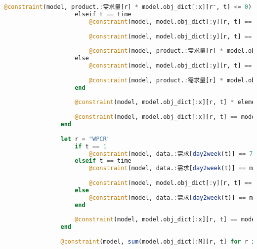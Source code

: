 \begin{appendices}
\begin{lstlisting}[language=julia]
                        @constraint(model, product.:需求量[r] * model.obj_dict[:x][r⁻, t] <= 0)
                    elseif t == time
                        @constraint(model, model.obj_dict[:y][r, t] == model.obj_dict[:y][r, t-1] + model.obj_dict[:x][r, t] - product.:需求量[r] * model.obj_dict[:x][r⁻, t])
    
                        @constraint(model, model.obj_dict[:y][r, t] == 0)
    
                        @constraint(model, product.:需求量[r] * model.obj_dict[:x][r⁻, t] <= model.obj_dict[:y][r, t-1])
                    else
                        @constraint(model, model.obj_dict[:y][r, t] == model.obj_dict[:y][r, t-1] + model.obj_dict[:x][r, t] - product.:需求量[r] * model.obj_dict[:x][r⁻, t])
    
                        @constraint(model, product.:需求量[r] * model.obj_dict[:x][r⁻, t] <= model.obj_dict[:y][r, t-1])
                    end
    
                    @constraint(model, model.obj_dict[:x][r, t] * element[r].:工时消耗 == model.obj_dict[:M][r, t] * model.obj_dict[:ω][r, t])
    
                    @constraint(model, model.obj_dict[:x][r, t] == model.obj_dict[:x][r, t] * model.obj_dict[:ω][r, t])
                end
    
                let r = "WPCR"
                    if t == 1
                        @constraint(model, data.:需求[day2week(t)] == 75 + model.obj_dict[:x][r, t] - model.obj_dict[:y][r, t])
                    elseif t == time
                        @constraint(model, data.:需求[day2week(t)] == model.obj_dict[:y][r, t-1] + model.obj_dict[:x][r, t] - model.obj_dict[:y][r, t])
    
                        @constraint(model, model.obj_dict[:y][r, t] == 0)
                    else
                        @constraint(model, data.:需求[day2week(t)] == model.obj_dict[:y][r, t-1] + model.obj_dict[:x][r, t] - model.obj_dict[:y][r, t])
                    end
    
                    @constraint(model, model.obj_dict[:x][r, t] == model.obj_dict[:x][r, t] * model.obj_dict[:ω][r, t])
                end
    
                @constraint(model, sum(model.obj_dict[:M][r, t] for r in element_key) <= data.:生产总工时限制[int2week(t)] * (1 - model.obj_dict[:μ][t] + 0.1 * model.obj_dict[:μ][t-1] + 0.08 * model.obj_dict[:μ][t-2] + 0.06 * model.obj_dict[:μ][t-3] + 0.04 * model.obj_dict[:μ][t-4] + 0.02 * model.obj_dict[:μ][t-5]))
    

\end{lstlisting}
\end{appendices}
